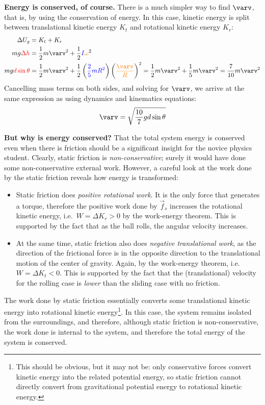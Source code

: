\documentclass{../../oss-handout}
\begin{document}
\textbf{Energy is conserved, of course.} There is a much simpler way to find
$\varv$, that is, by using the conservation of energy. In this case, kinetic
energy is split between translational kinetic energy $K_t$ and rotational
kinetic energy $K_r$:
\begin{align*}
  \Delta U_g&=K_t+K_r\\
  mg\textcolor{red}{\Delta h}&=\frac12 m\varv^2+
  \frac12
  \textcolor{blue}{I}\textcolor{orange}{\omega}^2\\
  mg\textcolor{red}{d\sin\theta}&=\frac12m\varv^2+\frac12
  \left(\textcolor{blue}{\frac25mR^2}\right)
  \left(\textcolor{orange}{\frac{\varv}R}\right)^2
  =\frac12 m\varv^2+\frac15m\varv^2=\frac7{10}m\varv^2
\end{align*}
Cancelling mass terms on both sides, and solving for $\varv$, we arrive at
the same expression as using dynamics and kinematics equations:
\begin{equation}
  \varv=\sqrt{\frac{10}7gd\sin\theta}
\end{equation}

\textbf{But why is energy conserved?} That the total system energy is conserved
even when there is friction should be a significant insight for the novice
physics student. Clearly, static friction is \emph{non-conservative}; surely it
would have done some non-conservative external work. However, a careful look at
the work done by the static friction reveals how energy is transformed:
\begin{itemize}[topsep=0pt]
\item Static friction does \emph{positive rotational work}. It is the only
  force that generates a torque, therefore the positive work done by $\vec f_s$
  increases the rotational kinetic energy, i.e.\ $W=\Delta K_r>0$ by the
  work-energy theorem. This is supported by the fact that as the ball rolls, the
  angular velocity increases.
\item At the same time, static friction also does \emph{negative translational
  work}, as the direction of the frictional force is in the opposite direction
  to the translational motion of the center of gravity. Again, by the
  work-energy theorem, i.e.\ $W=\Delta K_t<0$. This is supported by the fact
  that the (translational) velocity for the rolling case is \emph{lower} than
  the sliding case with no friction.
\end{itemize}
The work done by static friction essentially converts some translational kinetic
energy into rotational kinetic energy\footnote{This should be obvious, but it
  may not be: only conservative forces convert kinetic energy into the related
  potential energy, so static friction cannot directly convert from
  gravitational potential energy to rotational kinetic energy.}. In this case,
the system remains isolated from the surroundings, and therefore, although
static friction is non-conservative, the work done is internal to the system,
and therefore the total energy of the system is conserved.
\end{document}
